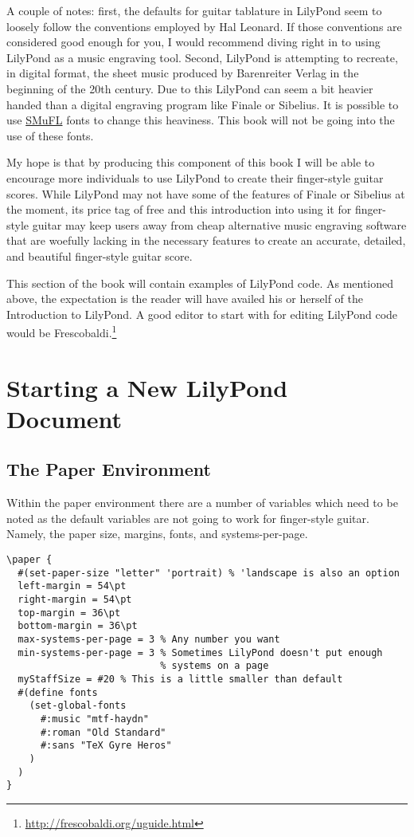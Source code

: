 \documentclass[]{memoir}
\begin{document}
A couple of notes: first, the defaults for guitar tablature in
LilyPond seem to loosely follow the conventions employed by Hal
Leonard. If those conventions are considered good enough for you, I
would recommend diving right in to using LilyPond as a music engraving
tool. Second, LilyPond is attempting to recreate, in digital format,
the sheet music produced by Barenreiter Verlag in the beginning of the
20th century. Due to this LilyPond can seem a bit heavier handed than
a digital engraving program like Finale or Sibelius. It is possible to
use \href{https://www.smufl.org/}{SMuFL} fonts to change this
heaviness. This book will not be going into the use of these fonts.

My hope is that by producing this component of this book I will be
able to encourage more individuals to use LilyPond to create their
finger-style guitar scores. While LilyPond may not have some of the
features of Finale or Sibelius at the moment, its price tag of free
and this introduction into using it for finger-style guitar may keep
users away from cheap alternative music engraving software that are
woefully lacking in the necessary features to create an accurate,
detailed, and beautiful finger-style guitar score.

This section of the book will contain examples of LilyPond code. As
mentioned above, the expectation is the reader will have availed his
or herself of the Introduction to LilyPond. A good editor to start
with for editing LilyPond code would be
Frescobaldi.\footnote{\url{http://frescobaldi.org/uguide.html}}

\chapter{Starting a New LilyPond Document}
\label{cha:start-new-lilyp}

\section{The Paper Environment}
\label{sec:paper-environment}

Within the paper environment there are a number of variables which
need to be noted as the default variables are not going to work for
finger-style guitar. Namely, the paper size, margins, fonts, and
systems-per-page.
\begin{verbatim}
\paper {
  #(set-paper-size "letter" 'portrait) % 'landscape is also an option
  left-margin = 54\pt 
  right-margin = 54\pt
  top-margin = 36\pt
  bottom-margin = 36\pt
  max-systems-per-page = 3 % Any number you want
  min-systems-per-page = 3 % Sometimes LilyPond doesn't put enough 
                           % systems on a page
  myStaffSize = #20 % This is a little smaller than default
  #(define fonts
    (set-global-fonts
      #:music "mtf-haydn"
      #:roman "Old Standard"
      #:sans "TeX Gyre Heros"
    )
  )
}
\end{verbatim}

\backmatter
\printindex
\end{document}
